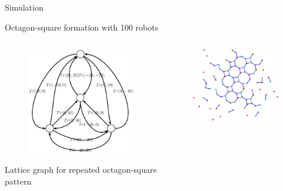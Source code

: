 \documentclass[10pt]{beamer}
\begin{document}
\begin{frame}{Simulation}
  \begin{block}{Octagon-square formation with 100 robots}
    \begin{columns}[T] %
      \begin{column}{.5\textwidth}
         \begin{figure}
          \centering
            \includegraphics[width=.95\linewidth]{figs/octagonsquare}
          \end{figure}
          \begin{center}
            Lattice graph for repeated octagon-square pattern
          \end{center}
      \end{column}%
      \begin{column}{.5\textwidth}   
        \begin{figure}
          \centering
          \includegraphics[width=\linewidth]{figs/final-formation}

\end{figure}
\end{column}
\end{columns}
\end{block}
\end{frame}
\end{document}
